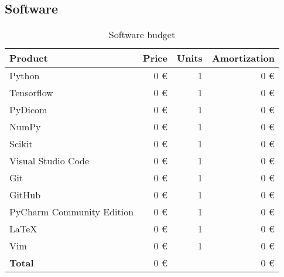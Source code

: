 \subsection{Software}
\begin{frame}{\insertsubsec}
  \begin{table}[H]
    \centering
    \begin{tabular}{|l|r|r|r|}
      \hline
      \textbf{Product} & \textbf{Price} & \textbf{Units} & \textbf{Amortization} \\ \hline\hline
  
      Python & 0 \euro & 1 & 0 \euro \\ \hline
      Tensorflow & 0 \euro & 1 & 0 \euro \\ \hline
      PyDicom & 0 \euro & 1 & 0 \euro \\ \hline
      NumPy & 0 \euro & 1 & 0 \euro \\ \hline
      Scikit & 0 \euro & 1 & 0 \euro \\ \hline
      Visual Studio Code & 0 \euro & 1 & 0 \euro \\ \hline
      Git & 0 \euro & 1 & 0 \euro \\ \hline
      GitHub & 0 \euro & 1 & 0 \euro \\ \hline
      PyCharm Community Edition & 0 \euro & 1 & 0 \euro \\ \hline
      \LaTeX & 0 \euro & 1 & 0 \euro \\ \hline
      Vim & 0 \euro & 1 & 0 \euro \\ \hline
  
      \hline\hline
      \textbf{Total} & 0 \euro &  & 0  \euro \\ \hline
    \end{tabular}
    \caption{Software budget \label{tab:software-budget}}
  \end{table}
\end{frame}

